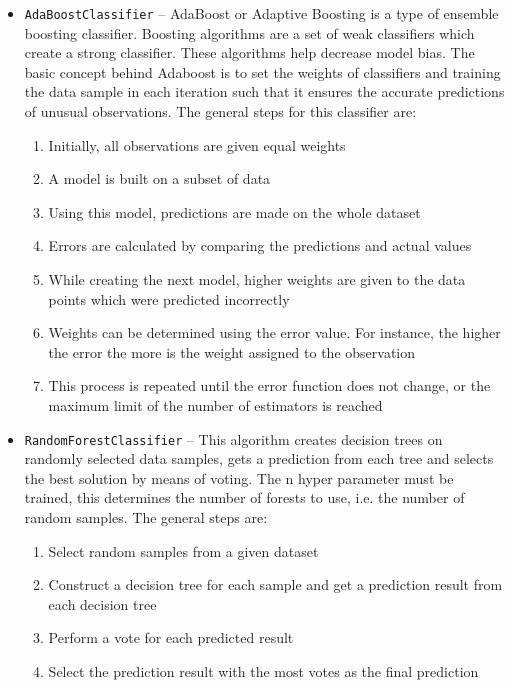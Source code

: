 \begin{itemize}
    \item \texttt{AdaBoostClassifier} -- AdaBoost or Adaptive Boosting is a type of ensemble boosting classifier. Boosting algorithms are a set of weak classifiers which create a strong classifier. These algorithms help decrease model bias. The basic concept behind Adaboost is to set the weights of classifiers and training the data sample in each iteration such that it ensures the accurate predictions of unusual observations. The general steps for this classifier are:
    \begin{enumerate}
        \item Initially, all observations are given equal weights
        \item A model is built on a subset of data
        \item Using this model, predictions are made on the whole dataset
        \item Errors are calculated by comparing the predictions and actual values
        \item While creating the next model, higher weights are given to the data points which were predicted incorrectly
        \item Weights can be determined using the error value. For instance, the higher the error the more is the weight assigned to the observation
        \item This process is repeated until the error function does not change, or the maximum limit of the number of estimators is reached
    \end{enumerate}
    \item \texttt{RandomForestClassifier} -- This algorithm creates decision trees on randomly selected data samples, gets a prediction from each tree and selects the best solution by means of voting. The n hyper parameter must be trained, this determines the number of forests to use, i.e. the number of random samples. The general steps are:
    \begin{enumerate}
        \item Select random samples from a given dataset
        \item Construct a decision tree for each sample and get a prediction result from each decision tree
        \item Perform a vote for each predicted result
        \item Select the prediction result with the most votes as the final prediction
    \end{enumerate}
    \begin{figure}[h!]

\end{figure}
\end{itemize}
